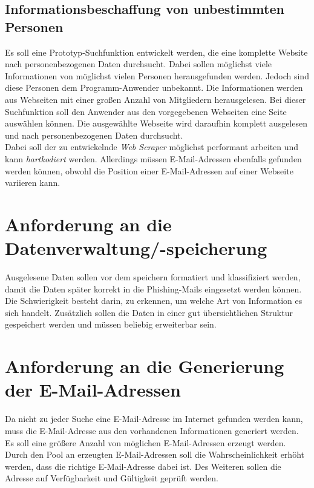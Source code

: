 	\subsection{Informationsbeschaffung von unbestimmten Personen}
	Es soll eine Prototyp-Suchfunktion entwickelt werden, die eine komplette Website nach personenbezogenen Daten durchsucht. Dabei sollen möglichst viele Informationen von möglichst vielen Personen herausgefunden werden. Jedoch sind diese Personen dem Programm-Anwender unbekannt. Die Informationen werden aus Webseiten mit einer großen Anzahl von Mitgliedern herausgelesen. Bei dieser Suchfunktion soll den Anwender aus den vorgegebenen Webseiten eine Seite auswählen können. Die ausgewählte Webseite wird daraufhin komplett ausgelesen und nach personenbezogenen Daten durchsucht.\\
	Dabei soll der zu entwickelnde \textit{Web Scraper} möglichst performant arbeiten und kann \textit{hartkodiert} werden. Allerdings müssen E-Mail-Adressen ebenfalls gefunden werden können, obwohl die Position einer E-Mail-Adressen auf einer Webseite variieren kann.
		
\section{Anforderung an die Datenverwaltung/-speicherung}
Ausgelesene Daten sollen vor dem speichern formatiert und klassifiziert werden, damit die Daten später korrekt in die Phishing-Mails eingesetzt werden können. Die Schwierigkeit besteht darin, zu erkennen, um welche Art von Information es sich handelt. Zusätzlich sollen die Daten in einer gut übersichtlichen Struktur gespeichert werden und müssen beliebig erweiterbar sein.
	
\section{Anforderung an die Generierung der E-Mail-Adressen}
Da nicht zu jeder Suche eine E-Mail-Adresse im Internet gefunden werden kann, muss die E-Mail-Adresse aus den vorhandenen Informationen generiert werden. Es soll eine größere Anzahl von möglichen E-Mail-Adressen erzeugt werden. Durch den Pool an erzeugten E-Mail-Adressen soll die Wahrscheinlichkeit erhöht werden, dass die richtige E-Mail-Adresse dabei ist. Des Weiteren sollen die Adresse auf Verfügbarkeit und Gültigkeit geprüft werden.
	
